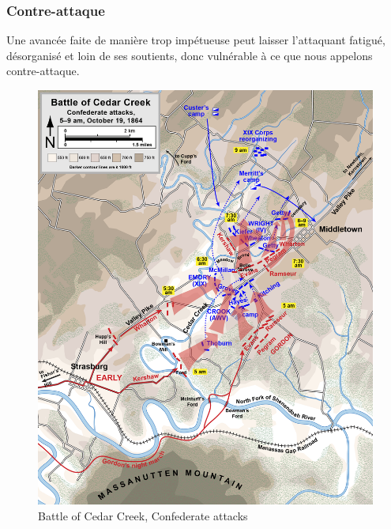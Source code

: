 \documentclass{article}
\begin{document}
\subsubsection{Contre-attaque}
Une avancée faite de manière trop impétueuse peut laisser l'attaquant fatigué, désorganisé et loin de ses soutients, donc vulnérable à ce que nous appelons \og{}contre-attaque\fg{}.
\begin{center}
\begin{figure}[H]
\hfill
\begin{minipage}[H]{0.5\linewidth}
	\centering
	\includegraphics[width=\linewidth]{../ressources/Cedar_Creek_Confederate_attacks}
	\caption{Battle of Cedar Creek, Confederate attacks}
\end{minipage}
\hfill
\begin{minipage}[H]{0.45\linewidth}
	\centering

\end{minipage}
\end{figure}
\end{center}
\end{document}
